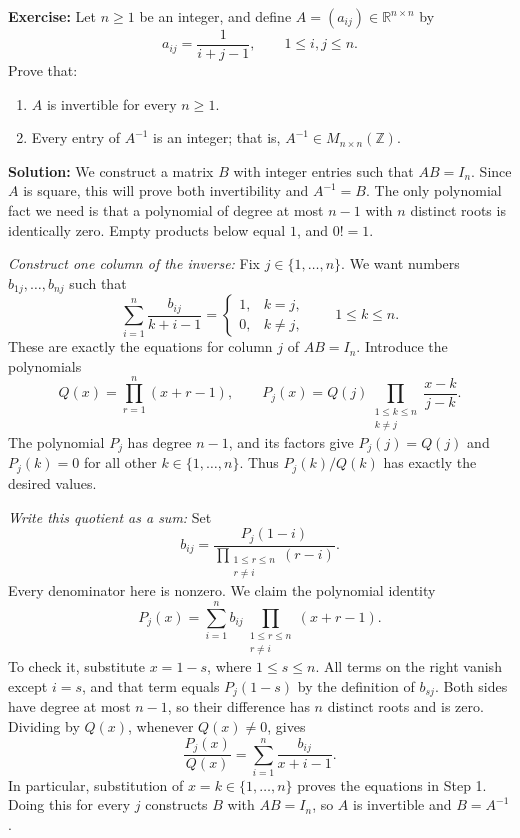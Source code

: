 \documentclass[a4paper,11pt,abstract=true]{scrartcl}
\theoremstyle{dotlessP}
\theoremstyle{dotlessS}
\theoremstyle{remark}
\theoremstyle{definition}
\begin{document}
\begin{problem_box}
\textbf{Exercise:}
Let $n\geq1$ be an integer, and define $A=(a_{ij})\in\mathbb{R}^{n\times n}$
by
\[
a_{ij}=\frac{1}{i+j-1},\qquad 1\leq i,j\leq n.
\]
Prove that:
\begin{enumerate}
    \item $A$ is invertible for every $n\geq1$.
    \item Every entry of $A^{-1}$ is an integer; that is,
    $A^{-1}\in M_{n\times n}(\mathbb{Z})$.
\end{enumerate}
\end{problem_box}

\begin{claim_box}
\textbf{Solution:} We construct a matrix
$B$ with integer entries such that $AB=I_n$. Since $A$ is square,
this will prove both invertibility and $A^{-1}=B$. The only polynomial
fact we need is that a polynomial of degree at most $n-1$ with $n$
distinct roots is identically zero. Empty products below equal $1$,
and $0!=1$.

\emph{Construct one column of the inverse:} Fix
$j\in\{1,\ldots,n\}$. We want numbers $b_{1j},\ldots,b_{nj}$ such that
\[
\sum_{i=1}^n\frac{b_{ij}}{k+i-1}
=\begin{cases}1,&k=j,\\0,&k\neq j,\end{cases}
\qquad 1\leq k\leq n.
\]
These are exactly the equations for column $j$ of $AB=I_n$.
Introduce the polynomials
\[
Q(x)=\prod_{r=1}^n(x+r-1),\qquad
P_j(x)=Q(j)\prod_{\substack{1\leq k\leq n\\k\neq j}}
\frac{x-k}{j-k}.
\]
The polynomial $P_j$ has degree $n-1$, and its factors give
$P_j(j)=Q(j)$ and $P_j(k)=0$ for all other $k\in\{1,\ldots,n\}$.
Thus $P_j(k)/Q(k)$ has exactly the desired values.

\emph{Write this quotient as a sum:} Set
\[
b_{ij}=\frac{P_j(1-i)}{
\displaystyle\prod_{\substack{1\leq r\leq n\\r\neq i}}(r-i)}.
\]
Every denominator here is nonzero. We claim the polynomial identity
\[
P_j(x)=\sum_{i=1}^n b_{ij}
\prod_{\substack{1\leq r\leq n\\r\neq i}}(x+r-1).
\]
To check it, substitute $x=1-s$, where $1\leq s\leq n$.
All terms on the right vanish except $i=s$, and that term equals
$P_j(1-s)$ by the definition of $b_{sj}$. Both sides have degree
at most $n-1$, so their difference has $n$ distinct roots and is zero.
Dividing by $Q(x)$, whenever $Q(x)\neq0$, gives
\[
\frac{P_j(x)}{Q(x)}=\sum_{i=1}^n\frac{b_{ij}}{x+i-1}.
\]
In particular, substitution of $x=k\in\{1,\ldots,n\}$ proves the
equations in Step 1. Doing this for every $j$ constructs $B$ with
$AB=I_n$, so $A$ is invertible and $B=A^{-1}$.


\end{claim_box}
\end{document}
